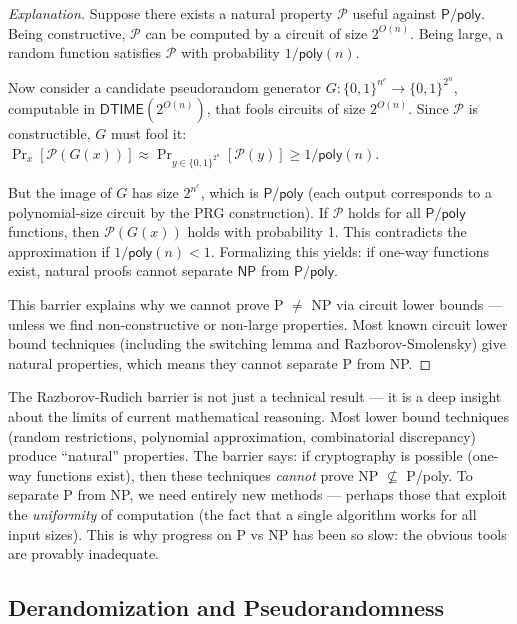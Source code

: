 \begin{proof}[Explanation]
Suppose there exists a natural property $\mathcal{P}$ useful against $\mathsf{P}/\mathsf{poly}$. Being constructive, $\mathcal{P}$ can be computed by a circuit of size $2^{O(n)}$. Being large, a random function satisfies $\mathcal{P}$ with probability $1/\mathsf{poly}(n)$. 

Now consider a candidate pseudorandom generator $G: \{0,1\}^{n^c} \to \{0,1\}^{2^n}$, computable in $\mathsf{DTIME}(2^{O(n)})$, that fools circuits of size $2^{O(n)}$. Since $\mathcal{P}$ is constructible, $G$ must fool it: $\Pr_{x}[ \mathcal{P}(G(x)) ] \approx \Pr_{y \in \{0,1\}^{2^n}}[ \mathcal{P}(y) ] \ge 1/\mathsf{poly}(n)$. 

But the image of $G$ has size $2^{n^c}$, which is $\mathsf{P}/\mathsf{poly}$ (each output corresponds to a polynomial-size circuit by the PRG construction). If $\mathcal{P}$ holds for all $\mathsf{P}/\mathsf{poly}$ functions, then $\mathcal{P}(G(x))$ holds with probability 1. This contradicts the approximation if $1/\mathsf{poly}(n) < 1$. Formalizing this yields: if one-way functions exist, natural proofs cannot separate $\mathsf{NP}$ from $\mathsf{P}/\mathsf{poly}$.

This barrier explains why we cannot prove P $\neq$ NP via circuit lower bounds — unless we find non-constructive or non-large properties. Most known circuit lower bound techniques (including the switching lemma and Razborov-Smolensky) give natural properties, which means they cannot separate P from NP.
\end{proof}

The Razborov-Rudich barrier is not just a technical result — it is a deep insight about the limits of current mathematical reasoning. Most lower bound techniques (random restrictions, polynomial approximation, combinatorial discrepancy) produce ``natural'' properties. The barrier says: if cryptography is possible (one-way functions exist), then these techniques \emph{cannot} prove NP $\not\subseteq$ P/poly. To separate P from NP, we need entirely new methods — perhaps those that exploit the \emph{uniformity} of computation (the fact that a single algorithm works for all input sizes). This is why progress on P vs NP has been so slow: the obvious tools are provably inadequate.

\subsection{Derandomization and Pseudorandomness}
\label{sec:complexity:derand}

